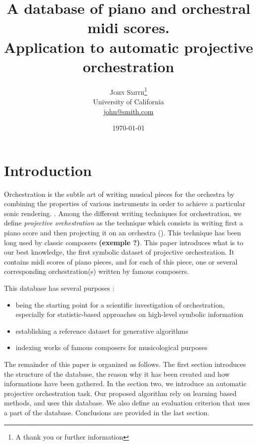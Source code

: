 \documentclass[twoside,twocolumn]{article}
\title{A database of piano and orchestral midi scores.\\Application to automatic projective orchestration} %
\author{%
\textsc{John Smith}\thanks{A thank you or further information} \\[1ex] %
\normalsize University of California \\ %
\normalsize \href{mailto:john@smith.com}{john@smith.com} %
}
\date{\today} %
\begin{document}
\maketitle


\section{Introduction}
Orchestration is the subtle art of writing musical pieces for the orchestra by combining the properties of various instruments in order to achieve a particular sonic rendering. \cite{koechli_orch,Rimsky-Korsakov:1873aa}. 
Among the different writing techniques for orchestration, we define \textit{projective orchestration} as the technique which consists in writing first a piano score and then projecting it on an orchestra (). This technique has been long used by classic composers \textbf{(exemple ?)}.
This paper introduces what is to our best knowledge, the first symbolic dataset of projective orchestration.
It contains midi scores of piano pieces, and for each of this piece, one or several corresponding orchestration(s) written by famous composers.

This database has several purposes :
\begin{itemize}
\item being the starting point for a scientific investigation of orchestration, especially for statistic-based approaches on high-level symbolic information
\item establishing a reference dataset for generative algorithms 
\item indexing works of famous composers for musicological purposes
\end{itemize}

The remainder of this paper is organized as follows. The first section introduces the structure of the database, the reason why it has been created and how informations have been gathered. In the section two, we introduce an automatic projective orchestration task. Our proposed algorithm rely on learning based methods, and uses this database. We also define an evaluation criterion that uses a part of the database. Conclusions are provided in the last section.
\end{document}
